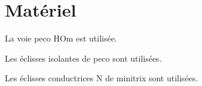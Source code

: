 
\section{Matériel}

La voie peco HOm est utilisée.

Les éclisses isolantes de peco sont utilisées.

Les éclisses conductrices N de minitrix sont utilisées.


